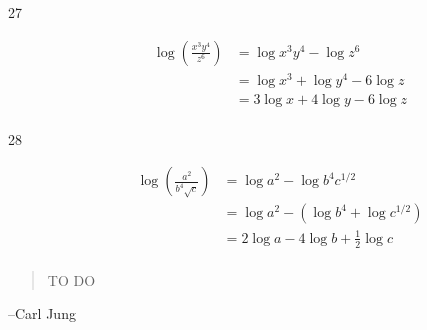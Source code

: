 \documentclass{exam}
\begin{document}
\begin{description}
      \item[27] 
        \begin{align*}
          \log \left( \frac{x^3y^4}{z^6} \right) &= \log x^3y^4 - \log z^6 \\
                                                 &= \log x^3 + \log y^4 - 6 \log z \\
                                                 &= 3 \log x + 4 \log y - 6 \log z \\
        \end{align*}

      \item[28] 
        \begin{align*}
          \log \left( \frac{a^2}{b^4 \sqrt{c}} \right) &= \log a^2 - \log b^4 c^{1/2} \\
                                                       &= \log a^2 - \left( \log b^4 + \log c^{1/2} \right) \\
                                                       &= 2 \log a - 4 \log b + \frac{1}{2} \log c \\
        \end{align*}

    \end{description}

  \else
    \vspace{2 cm}
    \begin{quote}
      \begin{em}
        TO DO
      \end{em}
    \end{quote}

    \hspace{1 cm} --Carl Jung
  \fi
\end{document}

